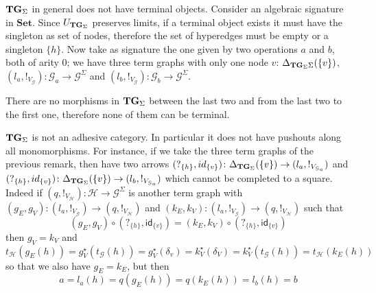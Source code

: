 \documentclass[runningheads,envcountsect]{lipics-v2021}
\newcommand{\Set}{\mathbf{Set}}
\newcommand{\catname}[1]{\textbf{\textup{#1}}}
\newcommand{\tg}[0]{\catname{TG}_{\Sigma}}
\newcommand{\id}[1]{\mathsf{id}_{#1}}
\begin{document}
\begin{remark}
	$\tg$ in general does not have terminal objects. Consider an algebraic signature in $\Set$. Since $U_{\tg}$ preserves limits, if a terminal object exists it must have the singleton as set of nodes, therefore the set of hyperedges must be empty or a singleton $\{h\}$. Now take as signature the one given by two operations $a$ and $b$, both of arity $0$; we have three term graphs with only one node $v$: $\Delta_{\tg{\Sigma}}(\{v\})$, $(l_a, !_{V_{\mathcal{G}}})\colon \mathcal{G}_a\to \mathcal{G}^{\Sigma}$ and $(l_b, !_{V_{\mathcal{G}}})\colon \mathcal{G}_b\to \mathcal{G}^{\Sigma}$.
	\begin{center}
	\end{center}
	There are no morphisms in $\tg$ between the last two and from the last two to the first one, therefore none of them can be terminal.
\end{remark}

\begin{remark}
	$\tg$ is not an adhesive category. In particular it does not have pushouts along all monomorphisms. For instance, if we take the three term graphs of the previous remark, then have two arrows
	$(?_{\{h\}}, \id{\{v\}})\colon \Delta_{\tg}(\{v\})\to (l_a, !_{V_{\mathcal{G}_a}})$ and $(?_{\{h\}}, \id{\{v\}})\colon \Delta_{\tg}(\{v\})\to (l_b, !_{V_{\mathcal{G}_a}})$ which cannot be completed to a square. Indeed if $(q, !_{V_\mathcal{H}})\colon \mathcal{H}\to \mathcal{G}^\Sigma$ is another term graph with $(g_E, g_V)\colon (l_a, !_{V_{\mathcal{G}}})\to (q, !_{V_\mathcal{H}})$ and $(k_E, k_V)\colon (l_a, !_{V_{\mathcal{G}}})\to (q, !_{V_\mathcal{H}})$  such that 
	\[(g_E, g_V)\circ (?_{\{h\}}, \id{\{v\}}) = (k_E, k_V)\circ (?_{\{h\}}, \id{\{v\}})\]
	then $g_V=k_V$ and
	\[t_{\mathcal{H}}(g_E(h))=g^\star_V(t_{\mathcal{G}}(h))=g_V^\star(\delta_v)=k^\star_V(\delta_V)=k^\star_V(t_{\mathcal{G}}(h))=t_{\mathcal{H}}(k_E(h))\]
	so that we also have $g_E=k_E$, but then
	\[
	a=l_a(h)=q(g_E(h))=q(k_E(h))=l_b(h)=b\]
\end{remark}
\end{document}
